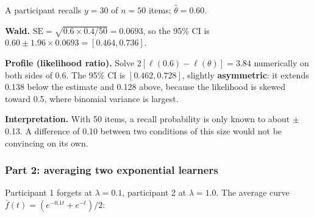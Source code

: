 A participant recalls \(y = 30\) of \(n = 50\) items;
\(\hat\theta = 0.60\).

\textbf{Wald.} \(\mathrm{SE} = \sqrt{0.6 \times 0.4 / 50} = 0.0693\), so
the 95\% CI is \(0.60 \pm 1.96 \times 0.0693 = [0.464, 0.736]\).

\textbf{Profile (likelihood ratio).} Solve
\(2[\ell(0.6) - \ell(\theta)] = 3.84\) numerically on both sides of 0.6.
The 95\% CI is \([0.462, 0.728]\), slightly \textbf{asymmetric}: it
extends 0.138 below the estimate and 0.128 above, because the likelihood
is skewed toward 0.5, where binomial variance is largest.

\textbf{Interpretation.} With 50 items, a recall probability is only
known to about \ensuremath{\pm}0.13. A difference of 0.10 between two conditions of
this size would not be convincing on its own.

\subsubsection{Part 2: averaging two exponential learners}

Participant 1 forgets at \(\lambda = 0.1\), participant 2 at
\(\lambda = 1.0\). The average curve
\(\bar f(t) = (e^{-0.1t} + e^{-t})/2\):

